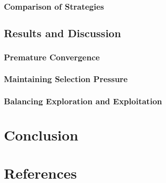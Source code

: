 \documentclass[conference]{inc/IEEEtran}
\begin{document}
\subsubsection{Comparison of Strategies}
\subsection{Results and Discussion}

\subsubsection{Premature Convergence}

\subsubsection{Maintaining Selection Pressure}

\subsubsection{Balancing Exploration and Exploitation}

\section{Conclusion}

\section*{References}




\end{document}
